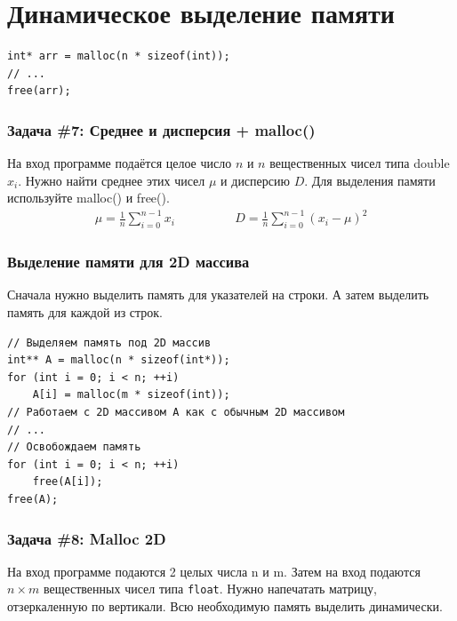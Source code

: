 \documentclass{article}
\begin{document}
\newpage

\section*{Динамическое выделение памяти}
\begin{lstlisting}
int* arr = malloc(n * sizeof(int));
// ...  
free(arr);
\end{lstlisting}
\subsubsection*{\Squarepipe \quad Задача \#7: Среднее и дисперсия + malloc()}
На вход программе подаётся целое число $n$ и $n$ вещественных чисел типа double ${x_i}$. Нужно найти среднее этих чисел $\mu$ и дисперсию $D$. Для выделения памяти используйте malloc() и free(). 
\begin{align*}
  \mu = \frac{1}{n}\sum_{i=0}^{n-1}x_i & \quad \quad \quad \quad D = \frac{1}{n}\sum_{i=0}^{n-1}(x_i - \mu)^2
\end{align*}

\subsubsection*{Выделение памяти для 2D массива}
Сначала нужно выделить память для указателей на строки. А затем выделить память для каждой из строк.
\begin{lstlisting}
// Выделяем память под 2D массив
int** A = malloc(n * sizeof(int*));
for (int i = 0; i < n; ++i)
	A[i] = malloc(m * sizeof(int));
// Работаем с 2D массивом A как с обычным 2D массивом
// ...  
// Освобождаем память
for (int i = 0; i < n; ++i)
	free(A[i]);
free(A);
\end{lstlisting}

\subsubsection*{\Squarepipe \quad Задача \#8: Malloc 2D}
На вход программе подаются 2 целых числа n и m. Затем на вход подаются $n \times m$ вещественных чисел типа \texttt{float}. Нужно напечатать матрицу, отзеркаленную по вертикали. Всю необходимую память выделить динамически.
\end{document}
